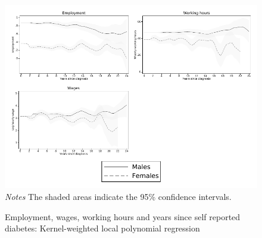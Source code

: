 \documentclass[12pt,english]{article}
\begin{document}
\begin{figure}[!ht]
	\caption{\label{fig:Kernel-weighted-local-polynomial_comb}Employment, wages, working hours and years since self reported diabetes:  Kernel-weighted local polynomial regression}%
	\begin{center}
		\includegraphics[width=\linewidth]{figures/lpoly_combined.pdf}\\
		\footnotesize{\textit{Notes} The shaded areas indicate the 95\% confidence intervals.}
	\end{center}
\end{figure}
\end{document}
